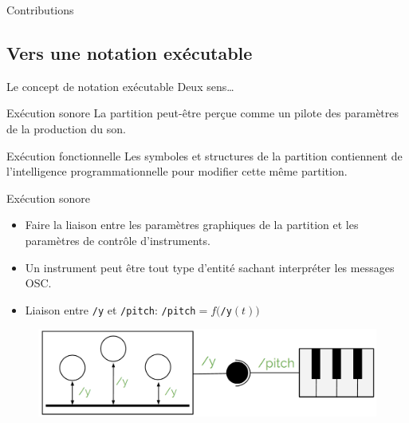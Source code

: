 \documentclass[pdf]{beamer}
\begin{document}
\begin{frame}{Contributions}
{\begin{figure}
		\end{figure}	
	}
\end{frame}

\subsection{Vers une notation exécutable}
\begin{frame}{Le concept de notation exécutable}
Deux sens…
\begin{block}{Exécution sonore}
La partition peut-être perçue comme un pilote des paramètres de la production du son.
\end{block}
\begin{block}{Exécution fonctionnelle}
Les symboles et structures de la partition contiennent de l'intelligence programmationnelle pour modifier cette même partition.
\end{block}
\end{frame}

\begin{frame}{Exécution sonore}
	\begin{itemize}[label=$\square$]
		\item Faire la liaison entre les paramètres graphiques de la partition et les paramètres de contrôle d'instruments.
		\item Un instrument peut être tout type d'entité sachant interpréter les messages OSC.
		\item Liaison entre \texttt{/y} et \texttt{/pitch}: \texttt{/pitch}$ = f($\texttt{/y}$(t))$
	\end{itemize}

	\begin{figure}
		\centering
		\includegraphics[keepaspectratio=true, width=\textwidth]{./medias/linkingParameters.png}
	\end{figure}	
\end{frame}
\end{document}
